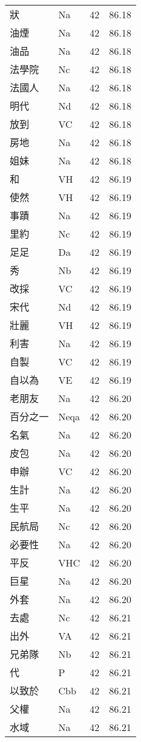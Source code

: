 \documentclass[twocolumn]{book}
\begin{document}
\begin{supertabular}{llrr}
狀 & Na & 42 &  86.18\\
油煙 & Na & 42 &  86.18\\
油品 & Na & 42 &  86.18\\
法學院 & Nc & 42 &  86.18\\
法國人 & Na & 42 &  86.18\\
明代 & Nd & 42 &  86.18\\
放到 & VC & 42 &  86.18\\
房地 & Na & 42 &  86.18\\
姐妹 & Na & 42 &  86.18\\
和 & VH & 42 &  86.19\\
使然 & VH & 42 &  86.19\\
事蹟 & Na & 42 &  86.19\\
里約 & Nc & 42 &  86.19\\
足足 & Da & 42 &  86.19\\
秀 & Nb & 42 &  86.19\\
改採 & VC & 42 &  86.19\\
宋代 & Nd & 42 &  86.19\\
壯麗 & VH & 42 &  86.19\\
利害 & Na & 42 &  86.19\\
自製 & VC & 42 &  86.19\\
自以為 & VE & 42 &  86.19\\
老朋友 & Na & 42 &  86.20\\
百分之一 & Neqa & 42 &  86.20\\
名氣 & Na & 42 &  86.20\\
皮包 & Na & 42 &  86.20\\
申辦 & VC & 42 &  86.20\\
生計 & Na & 42 &  86.20\\
生平 & Na & 42 &  86.20\\
民航局 & Nc & 42 &  86.20\\
必要性 & Na & 42 &  86.20\\
平反 & VHC & 42 &  86.20\\
巨星 & Na & 42 &  86.20\\
外套 & Na & 42 &  86.20\\
去處 & Nc & 42 &  86.21\\
出外 & VA & 42 &  86.21\\
兄弟隊 & Nb & 42 &  86.21\\
代 & P & 42 &  86.21\\
以致於 & Cbb & 42 &  86.21\\
父權 & Na & 42 &  86.21\\
水域 & Na & 42 &  86.21\\

\end{supertabular}
\end{document}
